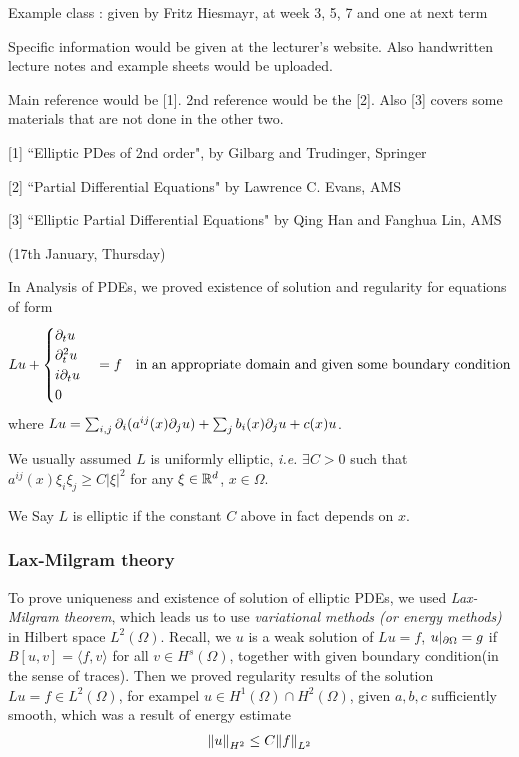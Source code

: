 \documentclass[12pt,a4paper]{article}
\begin{document}
Example class : given by Fritz Hiesmayr, at week 3, 5, 7 and one at next term

Specific information would be given at the lecturer's website. Also handwritten lecture notes and example sheets would be uploaded.

Main reference would be [1]. 2nd reference would be the [2]. Also [3] covers some materials that are not done in the other two.
\s

[1] ``Elliptic PDes of 2nd order", by Gilbarg and Trudinger, Springer

[2] ``Partial Differential Equations" by Lawrence C. Evans, AMS

[3] ``Elliptic Partial Differential Equations" by Qing Han and Fanghua Lin, AMS
\s

\newday

(17th January, Thursday)
\s

In Analysis of PDEs, we proved existence of solution and regularity for equations of form
\begin{align*}
Lu + \begin{cases}
\partial_t u \\
\partial_t^2  u\\
i\partial_t u\\
0
\end{cases} = f \quad \text{in an appropriate domain and given some boundary condition} 
\end{align*}
where $Lu = \sum_{i,j} \partial_i (a^{ij}(x) \partial_j u) + \sum_j b_i(x)\partial_j u + c(x)u$.

\quad We usually assumed $L$ is uniformly elliptic, \textit{i.e.} $\exists C>0$ such that $a^{ij}(x)\xi_i \xi_j \geq C|\xi|^2$ for any $\xi \in \mathbb{R}^d$, $x\in \Omega$.

\quad We Say $L$ is elliptic if the constant $C$ above in fact depends on $x$. 
\s

\subsubsection*{Lax-Milgram theory}

To prove uniqueness and existence of solution of elliptic PDEs, we used \emph{Lax-Milgram theorem}, which leads us to use \emph{variational methods (or energy methods)} in Hilbert space $L^2(\Omega)$. Recall, we $u$ is a weak solution of $Lu =f$, $u|_{\partial \Omega}=g$ if $B[u,v]= \langle f,v\rangle$ for all $v\in H^s(\Omega)$, together with given boundary condition(in the sense of traces). Then we proved regularity results of the solution $Lu =f \in L^2(\Omega)$, for exampel $u\in H^1(\Omega) \cap H^2(\Omega)$, given $a,b,c$ sufficiently smooth, which was a result of energy estimate
\begin{align*}
\snorms{u}{H^2}\leq C\snorms{f}{L^2}
\end{align*}
\end{document}
